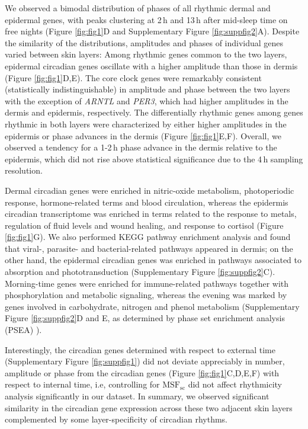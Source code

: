 We observed a bimodal distribution of phases of all rhythmic dermal and epidermal genes, with peaks clustering at 2\,h and 13\,h after mid-sleep time on free nights (Figure \ref{fig:fig1}D and Supplementary Figure \ref{fig:suppfig2}A). Despite the similarity of the distributions, amplitudes and phases of individual genes varied between skin layers: Among rhythmic genes common to the two layers,  epidermal circadian genes oscillate with a higher amplitude than those in dermis (Figure \ref{fig:fig1}D,E). The core clock genes were remarkably consistent (statistically indistinguishable) in amplitude and phase between the two layers with the exception of \textit{ARNTL} and \textit{PER3}, which had higher amplitudes in the dermis and epidermis, respectively. The differentially rhythmic genes among genes rhythmic in both layers were characterized by either higher amplitudes in the epidermis or phase advances in the dermis (Figure \ref{fig:fig1}E,F). Overall, we observed a tendency for a 1-2\,h phase advance in the dermis relative to the epidermis, which did not rise above statistical significance due to the 4\,h sampling resolution.

Dermal circadian genes were enriched in nitric-oxide metabolism, photoperiodic response, hormone-related terms and blood circulation, whereas the epidermis circadian transcriptome was enriched in terms related to the response to metals, regulation of fluid levels and wound healing, and response to cortisol (Figure \ref{fig:fig1}G). We also performed KEGG pathway enrichment analysis and found that viral-, parasite- and bacterial-related pathways appeared in dermis; on the other hand, the epidermal circadian genes was enriched in pathways associated to absorption and phototransduction (Supplementary Figure \ref{fig:suppfig2}C). Morning-time genes were enriched for immune-related pathways together with phosphorylation and metabolic signaling, whereas the evening was marked by genes involved in carbohydrate, nitrogen and phenol metabolism (Supplementary Figure \ref{fig:suppfig2}D and E, as determined by phase set enrichment analysis (PSEA) \cite{Zhang2016}). 

Interestingly, the circadian genes determined with respect to external time (Supplementary Figure \ref{fig:suppfig1}) did not deviate appreciably in number, amplitude or phase from the circadian genes (Figure \ref{fig:fig1}C,D,E,F) with respect to internal time, i.e, controlling for $\textrm{MSF}_\textrm{sc}$ did not affect rhythmicity analysis significantly in our dataset.  In summary, we observed significant similarity in the circadian gene expression across these two adjacent skin layers complemented by some layer-specificity of circadian rhythms. 

